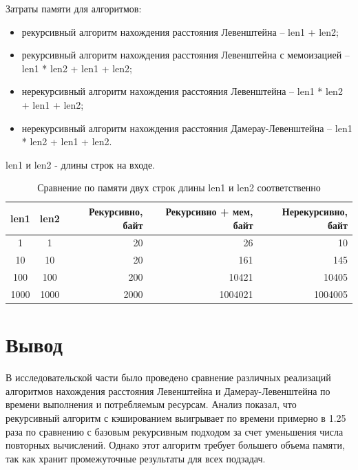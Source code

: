 \documentclass[a4paper, 14pt]{extreport}
\begin{document}
    Затраты памяти для алгоритмов:
    \begin{itemize}
        \item рекурсивный алгоритм нахождения расстояния Левенштейна -- len1 + len2;
        \item рекурсивный алгоритм нахождения расстояния Левенштейна с мемоизацией -- len1 * len2 + len1 + len2;
        \item нерекурсивный алгоритм нахождения расстояния Левенштейна -- len1 * len2 + len1 + len2;
        \item нерекурсивный алгоритм нахождения расстояния Дамерау-Левенштейна -- len1 * len2 + len1 + len2.
    \end{itemize}

    len1 и len2 - длины строк на входе.

    \clearpage\begin{table}[H]
                  \begin{center}
                      \caption{\label{tbl:mem_comp} Сравнение по памяти двух строк длины len1 и len2 соответственно}
                      \begin{tabular}{|c|c|r|r|r|}
                          \hline
                          len1 & len2 & Рекурсивно, байт & Рекурсивно + мем, байт & Нерекурсивно, байт
                          \\ \hline
                          1 & 1 & 20 & 26 & 10
                          \\ \hline
                          10 & 10 & 20 & 161 & 145
                          \\ \hline
                          100 & 100 & 200 & 10421 & 10405
                          \\ \hline
                          1000 & 1000 & 2000 & 1004021 & 1004005
                          \\ \hline
                      \end{tabular}
                  \end{center}
    \end{table}

    \section*{Вывод}

    В исследовательской части было проведено сравнение различных реализаций алгоритмов нахождения расстояния Левенштейна и Дамерау-Левенштейна по времени выполнения и потребляемым ресурсам.
    Анализ показал, что рекурсивный алгоритм с кэшированием выигрывает по времени примерно в 1.25 раза по сравнению с базовым рекурсивным подходом за счет уменьшения числа повторных вычислений.
    Однако этот алгоритм требует большего объема памяти, так как хранит промежуточные результаты для всех подзадач.
\end{document}

